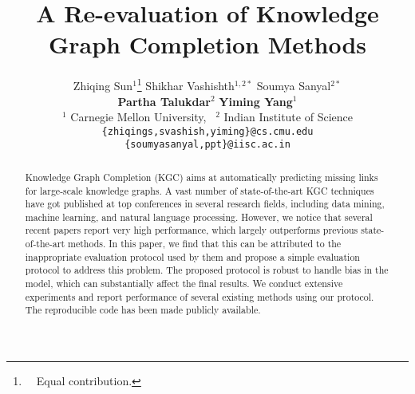 \documentclass[11pt,a4paper]{article}
\title{
A Re-evaluation of Knowledge Graph Completion Methods
}
\author{Zhiqing Sun$^1$\thanks{\ \ Equal contribution.} \quad Shikhar Vashishth$^{1,2*}$ \quad Soumya Sanyal$^{2*}$  \\ \textbf{Partha Talukdar}$^{2}$ \quad 	\textbf{Yiming Yang}$^1$\\
	$^1$ Carnegie Mellon University, \
	$^2$ Indian Institute of Science\\
	{\tt \small \{zhiqings,svashish,yiming\}@cs.cmu.edu} \\
	{\tt \small \{soumyasanyal,ppt\}@iisc.ac.in} \\
}
\date{}
\begin{document}
\maketitle

 \newcommand{\refalg}[1]{Algorithm \ref{#1}}
\newcommand{\refeqn}[1]{Equation \ref{#1}}
\newcommand{\reffig}[1]{Figure \ref{#1}}
\newcommand{\reftbl}[1]{Table \ref{#1}}
\newcommand{\refsec}[1]{Section \ref{#1}}


\newcommand{\datafb}{FB15k-237}
\newcommand{\datawn}{WN18RR}
\newcommand{\datayago}{YAGO3-10}

\newcommand{\reminder}[1]{\textcolor{red}{[[ #1 ]]}\typeout{#1}}
\newcommand{\reminderR}[1]{\textcolor{gray}{[[ #1 ]]}\typeout{#1}}

\newcommand{\add}[1]{\textcolor{red}{#1}\typeout{#1}}
\newcommand{\remove}[1]{\sout{#1}\typeout{#1}}

\newcommand{\m}[1]{\mathcal{#1}}
\newcommand{\method}{SynGCN}
\newcommand{\methods}{WG}
\newcommand{\methodside}{SemGCN}
\newcommand{\methodsyn}{SynGCN}
\newcommand{\methodsidefull}{Semantic-GCN}
\newcommand{\methodsynfull}{Syntactic-GCN}

\newcommand{\problem}{DD}
\newcommand{\problemfull}{Document Dating}



\newcommand{\tensor}{\mathcal{X}}
\newcommand{\real}{\mathbb{R}}

\newcommand{\tuples}{\mathbb{T}}

\newcommand{\argmax}{arg\,max}

\newcommand\norm[1]{\left\lVert#1\right\rVert}

\newcommand{\note}[1]{\textcolor{blue}{#1}}

\newcommand*{\Scale}[2][4]{\scalebox{#1}{$#2$}}\newcommand*{\Resize}[2]{\resizebox{#1}{!}{$#2$}}
\def\mat#1{\mbox{\bf #1}}

\theoremstyle{definition}
\newtheorem{definition}{Definition}[section]

\newtheorem{proposition}{Proposition}[section]
\newtheorem*{lemma*}{Lemma}


 
\begin{abstract}
Knowledge Graph Completion (KGC) aims at automatically predicting missing links for large-scale knowledge graphs. A vast number of state-of-the-art KGC techniques have got published at top conferences in several research fields, including data mining, machine learning, and natural language processing. However, we notice that several recent papers report very high performance, which largely outperforms previous state-of-the-art methods. 
In this paper, we find that this can be attributed to the inappropriate evaluation protocol used by them and propose a simple evaluation protocol to address this problem. The proposed protocol is robust to handle bias in the model, which can substantially affect the final results.
We conduct extensive experiments and report performance of several existing methods using our protocol. The reproducible code has been made publicly available.
\end{abstract}
\end{document}

